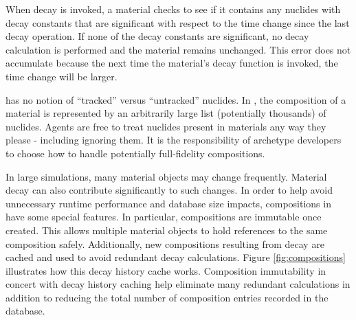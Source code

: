 When decay is invoked, a material checks to see if it contains any nuclides with
decay constants that are significant with respect to the time change since the
last decay operation.  If none of the decay constants are significant, no decay
calculation is performed and the material remains unchanged.  This error does
not accumulate because the next time the material's decay function is invoked,
the time change will be larger.

\Cyclus has no notion of ``tracked'' versus ``untracked'' nuclides.  In
\Cyclus, the composition of a material is represented by an arbitrarily large
list (potentially thousands) of nuclides.  Agents are free to treat nuclides
present in materials any way they please - including ignoring them.  It is the
responsibility of archetype developers to choose how to handle potentially
full-fidelity compositions.

In large simulations, many material objects may change frequently.  Material
decay can also contribute significantly to such changes.  In order to help
avoid unnecessary runtime performance and database size impacts, compositions
in \Cyclus have some special features.  In particular, compositions are
immutable once created. This allows multiple material objects to hold
references to the same composition safely.  Additionally, new compositions
resulting from decay are cached and used to avoid redundant decay
calculations.  Figure \ref{fig:compositions} illustrates how this decay
history cache works. Composition immutability in concert with decay history
caching help eliminate many redundant calculations in addition to reducing the
total number of composition entries recorded in the database.


